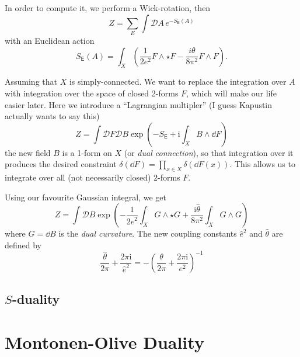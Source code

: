 \documentclass{article}
\newcommand{\ii}{\mathrm{i}}
\numberwithin{equation}{section}
\begin{document}
In order to compute it, we perform a Wick-rotation, then
\begin{equation}
Z=\sum_E \int \mathcal{D} A\, e^{-S_{\mathsf{E}}(A)}
\end{equation}
with an Euclidean action 
\begin{equation}
S_{\mathsf{E}}(A)=\int_X\left(\frac{1}{2 e^2} F \wedge \star F-\frac{i \theta}{8 \pi^2} F \wedge F\right).
\end{equation}

Assuming that $X$ is simply-connected. We want to replace the integration over $A$ with integration over the space of closed 2-forms $F$, which will make our life easier later. Here we introduce a ``Lagrangian multipler'' (I guess Kapustin actually wants to say this)
\begin{equation}
Z=\int \mathcal{D} F \mathcal{D} B \exp \left(-S_{\mathsf{E}}+\ii \int_X B \wedge \dd F\right)
\end{equation}
the new field $B$ is a 1-form on $X$ (or \textit{dual connection}), so that integration over it produces the desired constraint $\delta(\dd F)=\prod_{x\in X}\delta(\dd F(x))$. This allows us to integrate over all (not necessarily closed) 2-forms $F$. 

Using our favourite Gaussian integral, we get
\begin{equation}
Z=\int \mathcal{D} B \exp \left(-\frac{1}{2 \hat{e}^2} \int_X G \wedge \star G+\frac{\ii \hat{\theta}}{8 \pi^2} \int_X G \wedge G\right)
\end{equation}
where $G=\dd B$ is the \textit{dual curvature}. The new coupling constants $\hat{e}^2$ and $\hat{\theta}$ are defined by
\begin{equation}
\frac{\hat{\theta}}{2 \pi}+\frac{2 \pi \ii}{\hat{e}^2}=-\left(\frac{\theta}{2 \pi}+\frac{2 \pi \ii}{e^2}\right)^{-1}
\end{equation}



\subsection{$S$-duality}

\section{Montonen-Olive Duality}

\nocite{Witten:2008ep,Frenkel:2005pa}


\end{document}
